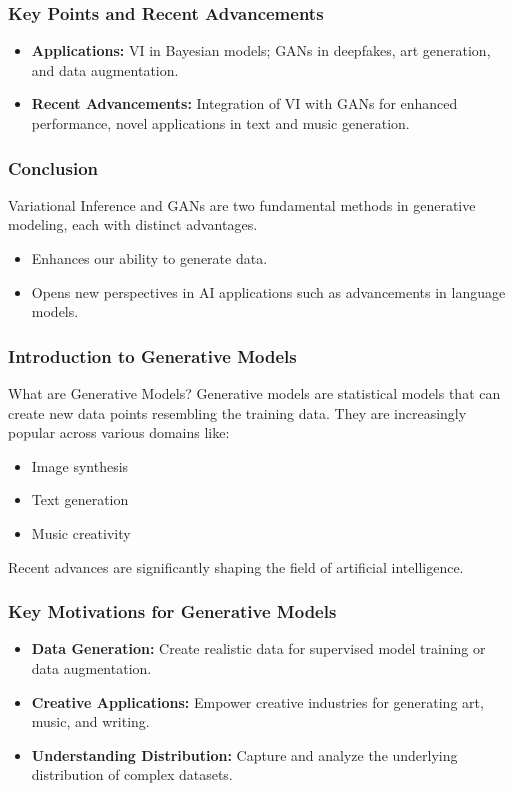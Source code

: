\documentclass[aspectratio=169]{beamer}
\begin{document}
\begin{frame}[fragile]
    \frametitle{Key Points and Recent Advancements}
    \begin{itemize}
        \item \textbf{Applications:} VI in Bayesian models; GANs in deepfakes, art generation, and data augmentation.
        \item \textbf{Recent Advancements:} Integration of VI with GANs for enhanced performance, novel applications in text and music generation.
    \end{itemize}
\end{frame}

\begin{frame}[fragile]
    \frametitle{Conclusion}
    Variational Inference and GANs are two fundamental methods in generative modeling, each with distinct advantages. 

    \begin{itemize}
        \item Enhances our ability to generate data.
        \item Opens new perspectives in AI applications such as advancements in language models.
    \end{itemize}
\end{frame}

\begin{frame}[fragile]
    \frametitle{Introduction to Generative Models}
    \begin{block}{What are Generative Models?}
        Generative models are statistical models that can create new data points resembling the training data. They are increasingly popular across various domains like:
    \end{block}
    \begin{itemize}
        \item Image synthesis
        \item Text generation
        \item Music creativity
    \end{itemize}
    Recent advances are significantly shaping the field of artificial intelligence.
\end{frame}

\begin{frame}[fragile]
    \frametitle{Key Motivations for Generative Models}
    \begin{itemize}
        \item \textbf{Data Generation:} Create realistic data for supervised model training or data augmentation.
        \item \textbf{Creative Applications:} Empower creative industries for generating art, music, and writing.
        \item \textbf{Understanding Distribution:} Capture and analyze the underlying distribution of complex datasets.
    \end{itemize}
\end{frame}
\end{document}
